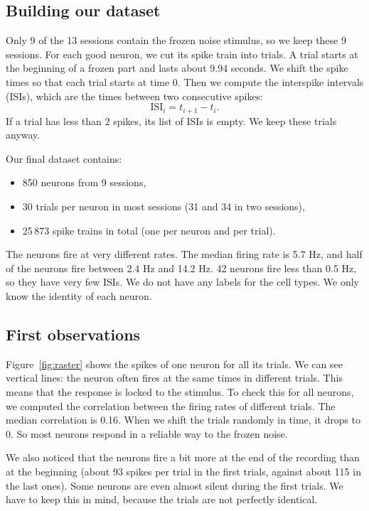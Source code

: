 \documentclass[11pt,a4paper]{article}
\begin{document}
\subsection{Building our dataset}
Only 9 of the 13 sessions contain the frozen noise stimulus, so we keep these 9 sessions. For each good neuron, we cut its spike train into trials. A trial starts at the beginning of a frozen part and lasts about 9.94 seconds. We shift the spike times so that each trial starts at time 0. Then we compute the interspike intervals (ISIs), which are the times between two consecutive spikes:
\[
    \text{ISI}_i = t_{i+1} - t_i .
\]
If a trial has less than 2 spikes, its list of ISIs is empty. We keep these trials anyway.

Our final dataset contains:
\begin{itemize}
    \item 850 neurons from 9 sessions,
    \item 30 trials per neuron in most sessions (31 and 34 in two sessions),
    \item 25\,873 spike trains in total (one per neuron and per trial).
\end{itemize}
The neurons fire at very different rates. The median firing rate is 5.7 Hz, and half of the neurons fire between 2.4 Hz and 14.2 Hz. 42 neurons fire less than 0.5 Hz, so they have very few ISIs. We do not have any labels for the cell types. We only know the identity of each neuron.

\subsection{First observations}
Figure~\ref{fig:raster} shows the spikes of one neuron for all its trials. We can see vertical lines: the neuron often fires at the same times in different trials. This means that the response is locked to the stimulus. To check this for all neurons, we computed the correlation between the firing rates of different trials. The median correlation is 0.16. When we shift the trials randomly in time, it drops to 0. So most neurons respond in a reliable way to the frozen noise.

We also noticed that the neurons fire a bit more at the end of the recording than at the beginning (about 93 spikes per trial in the first trials, against about 115 in the last ones). Some neurons are even almost silent during the first trials. We have to keep this in mind, because the trials are not perfectly identical.
\end{document}
